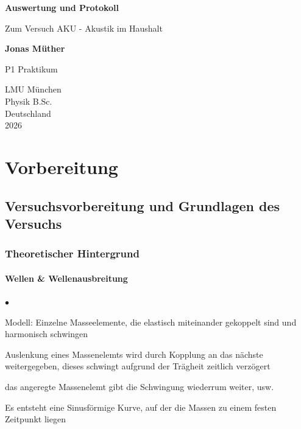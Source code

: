 \documentclass{report}
\begin{document}

\begin{titlepage}
    \begin{center}
        \vspace*{1cm}
            
        \Huge
        \textbf{Auswertung und Protokoll}
            
        \vspace{0.5cm}
        \LARGE
        Zum Versuch AKU - Akustik im Haushalt

        \vspace{1.8cm}

        \textbf{Jonas Müther}
        \vfill
            
        P1 Praktikum\\
       
            
        \vspace{0.8cm}
  

        \vspace{1.8cm}
        \Large
        LMU München \\
        Physik B.Sc.\\
        Deutschland\\
        2026
            
    \end{center}
\end{titlepage}
\tableofcontents

\newpage
\chapter{Vorbereitung}

\section{Versuchsvorbereitung und Grundlagen des Versuchs}
\subsection{Theoretischer Hintergrund}
\subsubsection{Wellen \& Wellenausbreitung}
\begin{list}{$\bullet$}{}
    \item Modell: Einzelne Masseelemente, die elastisch miteinander gekoppelt sind und harmonisch schwingen
    \item Auslenkung eines Massenelemts wird durch Kopplung an das nächste weitergegeben, dieses schwingt aufgrund der Trägheit zeitlich verzögert
    \item das angeregte Massenelemt gibt die Schwingung wiederrum weiter, usw.
    \item Es entsteht eine Sinusförmige Kurve, auf der die Massen zu einem festen Zeitpunkt liegen
\end{list}
\end{document}
